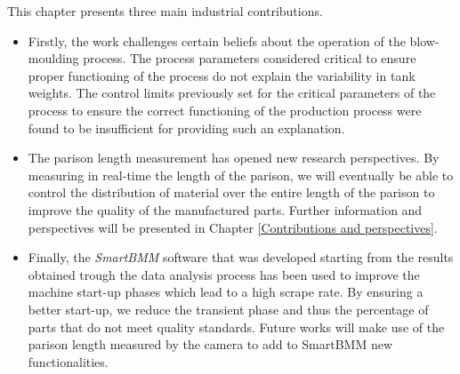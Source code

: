 This chapter presents three main industrial contributions.
\begin{itemize}
    \item Firstly, the work challenges certain beliefs about the operation of the blow-moulding process. The process parameters considered critical to ensure proper functioning of the process do not explain the variability in tank weights. The control limits previously set for the critical parameters of the process to ensure the correct functioning of the production process were found to be insufficient for providing such an explanation.
    \item The parison length measurement has opened new research perspectives. By measuring in real-time the length of the parison, we will eventually be able to control the distribution of material over the entire length of the parison to improve the quality of the manufactured parts. Further information and perspectives will be presented in Chapter \ref{Contributions and perspectives}.
    \item Finally, the \textit{SmartBMM} software that was developed starting from the results obtained trough the data analysis process has been used to improve the machine start-up phases which lead to a high scrape rate. By ensuring a better start-up, we reduce the transient phase and thus the percentage of parts that do not meet quality standards. Future works will make use of the parison length measured by the camera to add to SmartBMM new functionalities.  
\end{itemize}

